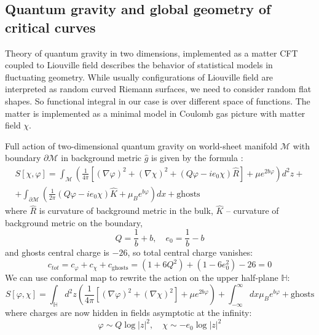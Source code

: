\documentclass[12pt]{article}
\begin{document}
\subsection{Quantum gravity and global geometry of critical curves}
\label{sec:quant-grav-glob}

Theory of quantum gravity in two dimensions, implemented as a matter CFT coupled to Liouville field
describes the behavior of statistical models in fluctuating geometry. 
While usually configurations of  Liouville field are interpreted as random curved Riemann surfaces,
we need to consider random flat shapes. So functional integral in our case is over different space
of functions. The matter is implemented as a minimal model in Coulomb gas picture with matter field
$\chi$.

Full action of two-dimensional quantum gravity on world-sheet manifold $\mathcal{M}$ with boundary
$\partial \mathcal{M}$ in background metric $\hat g$ is given by the formula \cite{kostov2004boundary}:
\begin{multline}
  \label{eq:160}
  S[\chi,\varphi]=\int_{\mathcal{M}}\left(\frac{1}{4\pi}[(\nabla \varphi)^{2}+(\nabla
    \chi)^{2}+(Q\varphi-ie_{0}\chi)\hat R]+\mu e^{2b\varphi}\right)d^{2}z +\\
  +  \int_{\partial
    \mathcal{M}}\left(\frac{1}{2\pi}(Q\varphi-ie_{0}\chi)\hat K + \mu_{B}e^{b\varphi}\right)dx+\mbox{ghosts}
\end{multline}
where $\hat R$ is curvature of background metric in the bulk, $\hat K$ -- curvature of background
metric on the boundary,
\begin{equation}
  \label{eq:161}
  Q=\frac{1}{b}+b,\quad e_{0}=\frac{1}{b}-b
\end{equation}
and ghosts central charge is $-26$, so total central charge vanishes:
\begin{equation}
  \label{eq:162}
  c_{tot}=c_{\varphi}+c_{\chi}+c_{\mathrm{ghosts}}=(1+6Q^{2})+(1-6e_{0}^{2})-26=0
\end{equation}
We can use conformal map to rewrite the action on the upper half-plane $\mathbb{H}$:
\begin{equation}
  \label{eq:159}
  S[\varphi,\chi]=\int_{\mathbb{H}} d^{2}z \left(\frac{1}{4\pi}[(\nabla \varphi)^{2}+(\nabla
    \chi)^{2}]+\mu e^{2b\varphi}\right) +\int_{-\infty}^{\infty} dx \mu_{B}e^{b\varphi} + \mbox{ghosts}
\end{equation}
where charges are now hidden in fields asymptotic at the infinity:
\begin{equation}
  \label{eq:163}
  \varphi\sim Q\log|z|^{2},\quad \chi\sim-e_{0}\log|z|^{2}
\end{equation}
\end{document}
